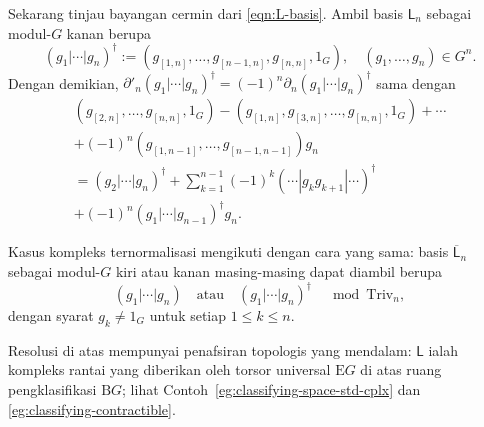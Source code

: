 Sekarang tinjau bayangan cermin dari \eqref{eqn:L-basis}. Ambil basis
$\mathsf{L}_n$ sebagai modul-$G$ kanan berupa
\begin{equation}\label{eqn:L-basis-right}
	(g_1 | \cdots | g_n)^\dagger := \left( g_{[1, n]}, \ldots, g_{[n-1, n]} , g_{[n, n]}, 1_G \right), \quad (g_1, \ldots, g_n) \in G^n.
\end{equation}
Dengan demikian,
$\partial'_n(g_1|\cdots|g_n)^\dagger=
(-1)^n\partial_n(g_1|\cdots|g_n)^\dagger$ sama dengan
\begin{multline}\label{eqn:L-basis-partial-right}
	\left( g_{[2, n]}, \ldots, g_{[n, n]}, 1_G \right) - \left( g_{[1, n]}, g_{[3, n]}, \ldots, g_{[n, n]}, 1_G \right) + \cdots \\
	+ (-1)^n \left( g_{[1, n-1]}, \ldots, g_{[n-1, n-1]} \right) g_n  \\
	= (g_2 | \cdots | g_n)^\dagger + \sum_{k=1}^{n-1} (-1)^k (\cdots | g_k g_{k+1} | \cdots)^\dagger \\
	+ (-1)^n (g_1 | \cdots | g_{n-1})^\dagger g_n.
\end{multline}

Kasus kompleks ternormalisasi mengikuti dengan cara yang sama: basis
$\overline{\mathsf{L}}_n$ sebagai modul-$G$ kiri atau kanan masing-masing
dapat diambil berupa
\begin{equation}\label{eqn:nor-cochain}
	(g_1| \cdots | g_n) \quad \text{atau} \quad (g_1 | \cdots | g_n)^\dagger \quad \bmod \mathrm{Triv}_n,
\end{equation}
dengan syarat $g_k\neq1_G$ untuk setiap $1\leq k\leq n$.

\begin{catatan}
	Resolusi di atas mempunyai penafsiran topologis yang mendalam:
	$\mathsf{L}$ ialah kompleks rantai yang diberikan oleh torsor universal
	$\mathrm{E}G$ di atas ruang pengklasifikasi $\mathrm{B}G$; lihat
	Contoh~\ref{eg:classifying-space-std-cplx} dan
	\ref{eg:classifying-contractible}.
\end{catatan}
